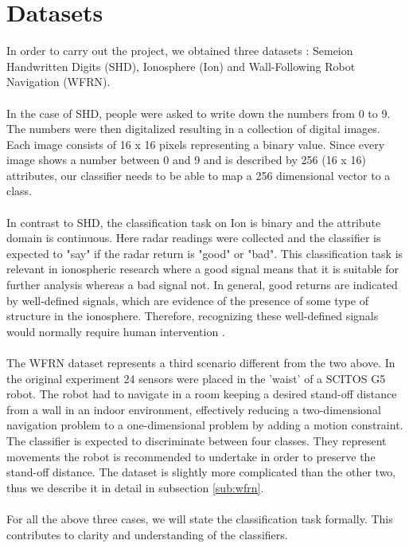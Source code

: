 \documentclass[a4paper, 11pt, twoside, openright]{article}
\begin{document}
\section{Datasets} \label{dataref}
In order to carry out the project, we obtained three datasets \cite{Lichman:2013}: Semeion Handwritten Digits (SHD), Ionosphere (Ion) and Wall-Following Robot Navigation (WFRN).
\\ \\
In the case of SHD, people were asked to write down the numbers from 0 to 9. The numbers were then digitalized resulting in a collection of digital images. Each image consists of 16 x 16 pixels representing a binary value. Since every image shows a number between 0 and 9 and is described by 256 (16 x 16) attributes, our classifier needs to be able to map a 256 dimensional vector to a class.
\\ \\
In contrast to SHD, the classification task on Ion is binary and the attribute domain is continuous. Here radar readings were collected and the classifier is expected to "say" if the radar return is "good" or "bad". This classification task is relevant in ionospheric research where a good signal means that it is suitable for further analysis whereas a bad signal not. In general, good returns are indicated by well-defined signals, which are evidence of the presence of some type of structure in the ionosphere. Therefore, recognizing these well-defined signals would normally require human intervention \cite{sigillito1989classification}.
\\ \\
The WFRN dataset represents a third scenario different from the two above. In the original experiment 24 sensors were placed in the 'waist' of a SCITOS G5 robot. The robot had to navigate in a room keeping a desired stand-off distance from a wall in an indoor environment, effectively reducing a two-dimensional navigation problem to a one-dimensional problem by adding a motion constraint. The classifier is expected to discriminate between four classes. They represent movements the robot is recommended to undertake in order to preserve the stand-off distance. The dataset is slightly more complicated than the other two, thus we describe it in detail in subsection \ref{sub:wfrn}.
\\ \\
For all the above three cases, we will state the classification task formally. This contributes to clarity and understanding of the classifiers.
\end{document}
